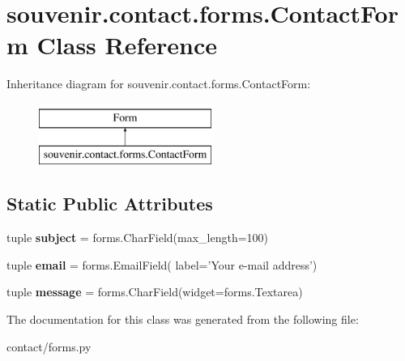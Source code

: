 \hypertarget{classsouvenir_1_1contact_1_1forms_1_1ContactForm}{\section{souvenir.\-contact.\-forms.\-Contact\-Form Class Reference}
\label{classsouvenir_1_1contact_1_1forms_1_1ContactForm}
}
Inheritance diagram for souvenir.\-contact.\-forms.\-Contact\-Form\-:\begin{figure}[H]
\begin{center}
\leavevmode
\includegraphics[height=2.000000cm]{classsouvenir_1_1contact_1_1forms_1_1ContactForm}
\end{center}
\end{figure}
\subsection*{Static Public Attributes}
\begin{DoxyCompactItemize}
\item 
\hypertarget{classsouvenir_1_1contact_1_1forms_1_1ContactForm_a367c0902b37baf7b4af3e3da92ac45b0}{tuple {\bfseries subject} = forms.\-Char\-Field(max\-\_\-length=100)}\label{classsouvenir_1_1contact_1_1forms_1_1ContactForm_a367c0902b37baf7b4af3e3da92ac45b0}

\item 
\hypertarget{classsouvenir_1_1contact_1_1forms_1_1ContactForm_a90e1e5f31646f763808e2d8672445a35}{tuple {\bfseries email} = forms.\-Email\-Field( label='Your e-\/mail address')}\label{classsouvenir_1_1contact_1_1forms_1_1ContactForm_a90e1e5f31646f763808e2d8672445a35}

\item 
\hypertarget{classsouvenir_1_1contact_1_1forms_1_1ContactForm_ab7dabefa8c362f9aae90dea3cdf0f117}{tuple {\bfseries message} = forms.\-Char\-Field(widget=forms.\-Textarea)}\label{classsouvenir_1_1contact_1_1forms_1_1ContactForm_ab7dabefa8c362f9aae90dea3cdf0f117}

\end{DoxyCompactItemize}


The documentation for this class was generated from the following file\-:\begin{DoxyCompactItemize}
\item 
contact/forms.\-py\end{DoxyCompactItemize}
